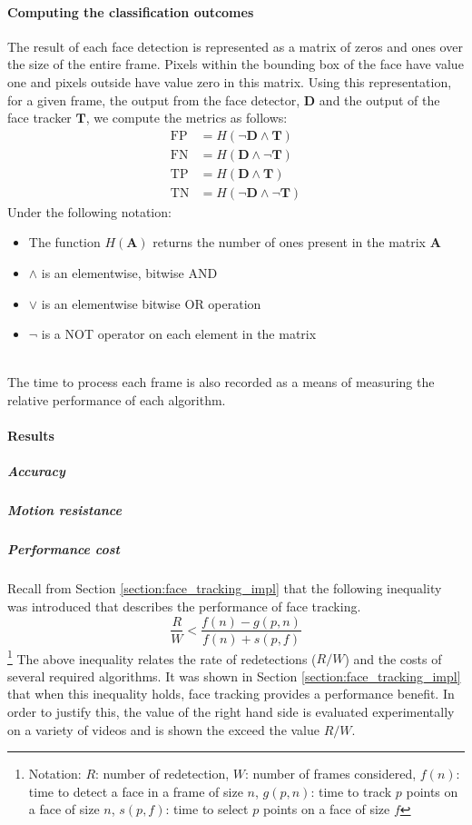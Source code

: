 \paragraph{Computing the classification outcomes} The result of each face detection is represented as a matrix of zeros and ones over the size of the entire frame.
Pixels within the bounding box of the face have value one and pixels outside have value zero in this matrix. Using this representation, for a given frame, the output from the face detector, $\mathbf{D}$ and the output of the face tracker $\mathbf{T}$, we compute the metrics as follows: 
\begin{align*}
    \mathrm{FP} &= H(\neg{\mathbf{D}} \wedge \mathbf{T}) \\
    \mathrm{FN} &= H(\mathbf{D} \wedge \neg{\mathbf{T}})\\
    \mathrm{TP} &= H(\mathbf{D} \wedge \mathbf{T})\\
    \mathrm{TN} &= H(\neg{\mathbf{D}} \wedge \neg{\mathbf{T}})
\end{align*}
Under the following notation: 
\begin{itemize}
    \item The function $H(\mathbf{A})$ returns the number of ones present in the matrix $\mathbf{A}$
    \item $\wedge$ is an elementwise, bitwise AND 
    \item $\vee$ is an elementwise bitwise OR operation 
    \item $\neg$ is a NOT operator on each element in the matrix
\\\\
\end{itemize}
The time to process each frame is also recorded as a means of measuring the relative performance of each algorithm.
\paragraph{Results}

\subparagraph{Accuracy}
\subparagraph{Motion resistance}

\subparagraph{Performance cost}
Recall from Section \ref{section:face_tracking_impl} that the following inequality was introduced that describes the performance of face tracking.
\begin{equation*}
    \frac{R}{W} < \frac{f(n)-g(p,n)}{f(n)+s(p,f)}
\end{equation*}\footnote{Notation: $R$: number of redetection, $W$: number of frames considered, $f(n)$: time to detect a face in a frame of size $n$, $g(p,n)$: time to track $p$ points on a face of size $n$, $s(p,f)$: time to select $p$ points on a face of size $f$ }
The above inequality relates the rate of redetections ($R/W$) and the costs of several required algorithms. It was shown in Section \ref{section:face_tracking_impl} that when this inequality holds, face tracking provides a performance benefit.
In order to justify this, the value of the right hand side is evaluated experimentally on a variety of videos and is shown the exceed the value $R/W$.



